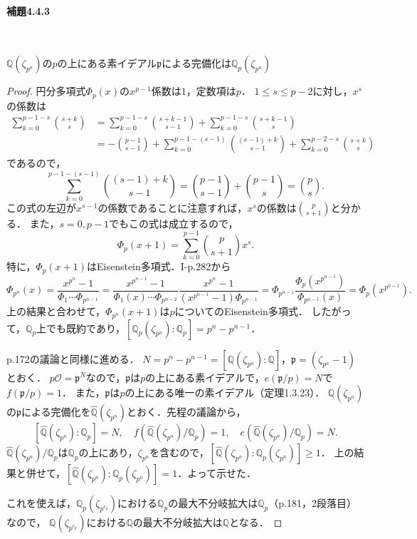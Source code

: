 \paragraph{補題4.4.3}~
\begin{screen}
  $\mathbb{Q}(\zeta_{p^n})$の$p$の上にある素イデアル$\mathfrak{p}$による完備化は$\mathbb{Q}_p(\zeta_{p^n})$
\end{screen}
\begin{proof}
  円分多項式$\Phi_p(x)$の$x^{p-1}$係数は$1$，定数項は$p$．
  $1\leq s\leq p-2$に対し，$x^s$の係数は
  \begin{align*}
    \sum_{k=0}^{p-1-s}\binom{s+k}{s} &= \sum_{k=0}^{p-1-s}\binom{s+k-1}{s-1}+\sum_{k=0}^{p-1-s}\binom{s+k-1}{s}\\
    &= -\binom{p-1}{s-1}+\sum_{k=0}^{p-1-(s-1)}\binom{(s-1)+k}{s-1}+\sum_{k=0}^{p-2-s}\binom{s+k}{s}
  \end{align*}
  であるので，
  \[\sum_{k=0}^{p-1-(s-1)}\binom{(s-1)+k}{s-1}=\binom{p-1}{s-1}+\binom{p-1}{s}=\binom{p}{s}.\]
  この式の左辺が$x^{s-1}$の係数であることに注意すれば，$x^s$の係数は$\binom{p}{s+1}$と分かる．
  また，$s=0,p-1$でもこの式は成立するので，
  \[\Phi_p(x+1)=\sum_{k=0}^{p-1}\binom{p}{s+1}x^s.\]
  特に，$\Phi_p(x+1)$はEisenstein多項式．I-p.282から
  \[\Phi_{p^n}(x) = \frac{x^{p^n}-1}{\Phi_1\cdots\Phi_{p^{n-1}}} = \frac{x^{p^{n-1}}-1}{\Phi_1(x)\cdots\Phi_{p^{n-2}}}\frac{x^{p^n}-1}{(x^{p^{n-1}}-1)\Phi_{p^{n-1}}}
  = \Phi_{p^{n-1}}\frac{\Phi_p(x^{p^{n-1}})}{\Phi_{p^{n-1}}(x)} = \Phi_p(x^{p^{n-1}}).\]
  上の結果と合わせて，$\Phi_{p^n}(x+1)$は$p$についてのEisenstein多項式．
  したがって，$\mathbb{Q}_p$上でも既約であり，$[\mathbb{Q}_p(\zeta_{p^n}):\mathbb{Q}_p]=p^n-p^{n-1}$．

  p.172の議論と同様に進める．
  $N=p^n-p^{n-1}=[\mathbb{Q}(\zeta_{p^n}):\mathbb{Q}]$，$\mathfrak{p}=(\zeta_{p^n}-1)$とおく．
  $p\mathcal{O}=\mathfrak{p}^N$なので，$\mathfrak{p}$は$p$の上にある素イデアルで，$e(\mathfrak{p}/p)=N$で$f(\mathfrak{p}/p)=1$．
  また，$\mathfrak{p}$は$p$の上にある唯一の素イデアル（定理1.3.23）．
  $\mathbb{Q}(\zeta_{p^n})$の$\mathfrak{p}$による完備化を$\widehat{\mathbb{Q}}(\zeta_{p^n})$とおく．先程の議論から，
  \[[\widehat{\mathbb{Q}}(\zeta_{p^n}):\mathbb{Q}_p]=N,\quad f(\widehat{\mathbb{Q}}(\zeta_{p^n})/\mathbb{Q}_p)=1,\quad e(\widehat{\mathbb{Q}}(\zeta_{p^n})/\mathbb{Q}_p)=N.\]
  $\widehat{\mathbb{Q}}(\zeta_{p^n})/\mathbb{Q}_p$は$\mathbb{Q}_p$の上にあり，$\zeta_{p^n}$を含むので，$[\widehat{\mathbb{Q}}(\zeta_{p^n}):\mathbb{Q}_p(\zeta_{p^n})]\geq1$．
  上の結果と併せて，$[\widehat{\mathbb{Q}}(\zeta_{p^n}):\mathbb{Q}_p(\zeta_{p^n})]=1$．よって示せた．

  これを使えば，$\mathbb{Q}_p(\zeta_{p^{e_p}})$における$\mathbb{Q}_p$の最大不分岐拡大は$\mathbb{Q}_p$（p.181，2段落目）なので，
  $\mathbb{Q}(\zeta_{p^{e_p}})$における$\mathbb{Q}$の最大不分岐拡大は$\mathbb{Q}$となる．
\end{proof}

